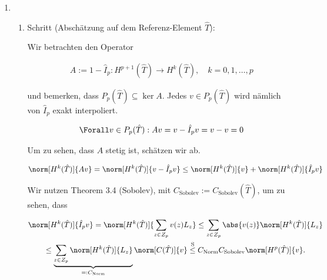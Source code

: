 \begin{solution}
\begin{enumerate}[label = \textbf{\alph*)}]
    \item \phantom{}


    \begin{enumerate}[label = \arabic*.]

      \item Schritt (Abschätzung auf dem Referenz-Element $\hat T$):

      Wir betrachten den Operator

      \begin{align*}
        A := 1 - \hat I_p:
        H^{p+1}(\hat T) \to H^k(\hat T),
        \quad
        k = 0, 1, \dots, p
      \end{align*}

      und bemerken, dass $P_p(\hat T) \subseteq \ker A$.
      Jedes $v \in P_p(\hat T)$ wird nämlich von $\hat I_p$ exakt interpoliert.

      \begin{align*}
        \Forall v \in P_p(\hat T):
        A v = v - \hat I_p v = v - v = 0
      \end{align*}

      Um zu sehen, dass $A$ stetig ist, schätzen wir ab.

      \begin{align*}
        \norm[H^k(\hat T)]{A v}
        =
        \norm[H^k(\hat T)]{v - \hat I_p v}
        \leq
        \norm[H^k(\hat T)]{v}
        +
        \norm[H^k(\hat T)]{\hat I_p v}
      \end{align*}

      Wir nutzen Theorem 3.4 (Sobolev), mit $C_\mathrm{Sobolev} := C_\mathrm{Sobolev}(\hat T)$, um zu sehen, dass

      \begin{multline*}
        \norm[H^k(\hat T)]{\hat I_p v}
        =
        \norm[H^k(\hat T)]
        {
          \sum_{z \in Z_p}
          v(z) L_z
        }
        \leq
        \sum_{z \in Z_p}
        \abs{v(z)} \norm[H^k(\hat T)]{L_z} \\
        \leq
        \underbrace
        {
          \sum_{z \in Z_p}
          \norm[H^k(\hat T)]{L_z}
        }_{
          =: C_\mathrm{Norm}
        }
        \norm[C(\hat T)]{v}
        \stackrel
        {
          \mathrm{S}
        }{\leq}
        C_\mathrm{Norm}
        C_\mathrm{Sobolev}
        \norm[H^p(\hat T)]{v}.
      \end{multline*}


\end{enumerate}
\end{enumerate}
\end{solution}
